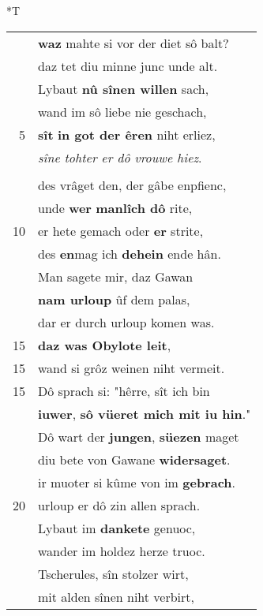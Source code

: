 \documentclass[8pt,a4paper,notitlepage]{article}
\begin{document}
\begin{table}[ht]
\begin{minipage}[t]{0.5\linewidth}
\end{minipage}
\hspace{0.5cm}
\begin{minipage}[t]{0.5\linewidth}
\small
\begin{center}*T
\end{center}
\begin{tabular}{rl}
 & \textbf{waz} mahte si vor der diet sô balt?\\ 
 & daz tet diu minne junc unde alt.\\ 
 & Lybaut \textbf{nû sînen willen} sach,\\ 
 & wand im sô liebe nie geschach,\\ 
5 & \textbf{sît} \textbf{in got der êren} niht erliez,\\ 
 & \textit{sîne tohter er dô vrouwe hiez}.\\ 
 & \textit{\begin{large}W\end{large}ie} diu hôchgezît ergienc,\\ 
 & des vrâget den, der gâbe enpfienc,\\ 
 & unde \textbf{wer} \textbf{manlîch dô} rite,\\ 
10 & er hete gemach oder \textbf{er} strite,\\ 
 & des \textbf{en}mag ich \textbf{dehein} ende hân.\\ 
 & Man sagete mir, daz Gawan\\ 
 & \textbf{nam urloup} ûf dem palas,\\ 
 & dar er durch urloup komen was.\\ 
15 & \textbf{daz was Obylote leit},\\ 
15 & wand si grôz weinen niht vermeit.\\ 
15 & Dô sprach si: "hêrre, sît ich bin\\ 
 & \textbf{iuwer}, \textbf{sô vüeret mich mit iu hin}."\\ 
 & Dô wart der \textbf{jungen}, \textbf{süezen} maget\\ 
 & diu bete von Gawane \textbf{widersaget}.\\ 
 & ir muoter si kûme von im \textbf{gebrach}.\\ 
20 & urloup er dô zin allen sprach.\\ 
 & Lybaut im \textbf{dankete} genuoc,\\ 
 & wander im holdez herze truoc.\\ 
 & Tscherules, sîn stolzer wirt,\\ 
 & mit alden sînen niht verbirt,\\ 

\end{tabular}
\end{minipage}
\end{table}
\end{document}
